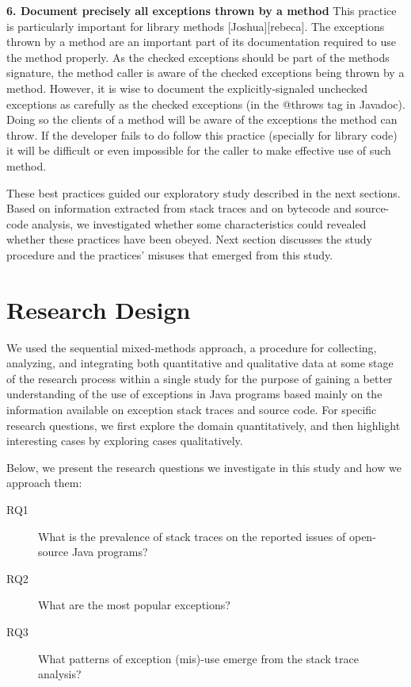 \documentclass[conference]{IEEEtran}
\begin{document}
\textbf{6. Document precisely all exceptions thrown by a method} This practice is particularly important for library methods [Joshua][rebeca]. The exceptions thrown by a method are an important part of its documentation required to use the method properly. As the checked exceptions should be part of the methods signature, the method caller is aware of the checked exceptions being thrown by a method. However, it is wise to document the explicitly-signaled unchecked exceptions as carefully as the checked exceptions (in the @throws tag in Javadoc). Doing so the clients of a method will be aware of the exceptions the method can throw. If the developer fails to do follow this practice (specially for library code) it will be difficult or even impossible for the caller to make effective use of such method.


These best practices guided our exploratory study described in the next sections. Based on information extracted from stack traces and on bytecode and source-code analysis, we investigated whether some characteristics could revealed whether these practices  have been obeyed. Next section discusses the study procedure and the practices' misuses that emerged from this study.

\section{Research Design}

We used the sequential mixed-methods approach, a procedure for collecting, analyzing, and integrating both quantitative and qualitative data at some stage of the research process within a single study for the purpose of gaining a better understanding of the use of exceptions in Java programs
based mainly on the information available on exception stack traces and source code. For specific research questions, we first explore the domain quantitatively, and then highlight interesting cases by exploring 
cases qualitatively. 

Below, we present the research questions we investigate in this study and how we approach them:
\begin{description}

    \item[RQ1] What is the prevalence of stack traces on the reported issues of open-source Java programs?
    \item[RQ2] What are the most popular exceptions?
    \item[RQ3] What patterns of exception (mis)-use emerge from the stack trace analysis?

\end{description}
\end{document}
